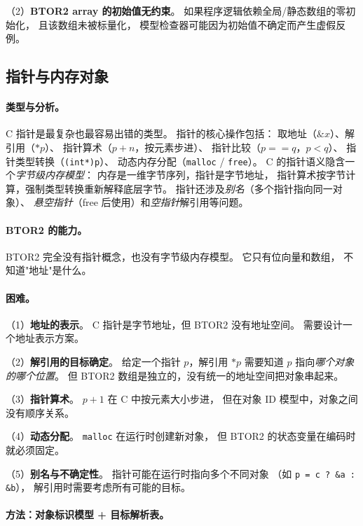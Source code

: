 \documentclass[11pt,a4paper]{article}
\begin{document}
（2）\textbf{BTOR2 array 的初始值无约束}。
如果程序逻辑依赖全局/静态数组的零初始化，
且该数组未被标量化，
模型检查器可能因为初始值不确定而产生虚假反例。


\subsection{指针与内存对象}
\label{sec:pointer}

\paragraph{类型与分析。}
C 指针是最复杂也最容易出错的类型。
指针的核心操作包括：
取地址（$\&x$）、解引用（$*p$）、
指针算术（$p + n$，按元素步进）、
指针比较（$p == q$，$p < q$）、
指针类型转换（\texttt{(int*)p}）、
动态内存分配（\texttt{malloc} / \texttt{free}）。
C 的指针语义隐含一个\emph{字节级内存模型}：
内存是一维字节序列，指针是字节地址，
指针算术按字节计算，强制类型转换重新解释底层字节。
指针还涉及\emph{别名}（多个指针指向同一对象）、
\emph{悬空指针}（free 后使用）和\emph{空指针}解引用等问题。

\paragraph{BTOR2 的能力。}
BTOR2 完全没有指针概念，也没有字节级内存模型。
它只有位向量和数组，
不知道"地址"是什么。

\paragraph{困难。}
（1）\textbf{地址的表示}。
C 指针是字节地址，但 BTOR2 没有地址空间。
需要设计一个地址表示方案。

（2）\textbf{解引用的目标确定}。
给定一个指针 $p$，解引用 $*p$ 需要知道 $p$ 指向\emph{哪个对象的哪个位置}。
但 BTOR2 数组是独立的，没有统一的地址空间把对象串起来。

（3）\textbf{指针算术}。
$p + 1$ 在 C 中按元素大小步进，
但在对象 ID 模型中，对象之间没有顺序关系。

（4）\textbf{动态分配}。
\texttt{malloc} 在运行时创建新对象，
但 BTOR2 的状态变量在编码时就必须固定。

（5）\textbf{别名与不确定性}。
指针可能在运行时指向多个不同对象
（如 \texttt{p = c ? \&a : \&b}），
解引用时需要考虑所有可能的目标。

\paragraph{方法：对象标识模型 + 目标解析表。}
\end{document}
